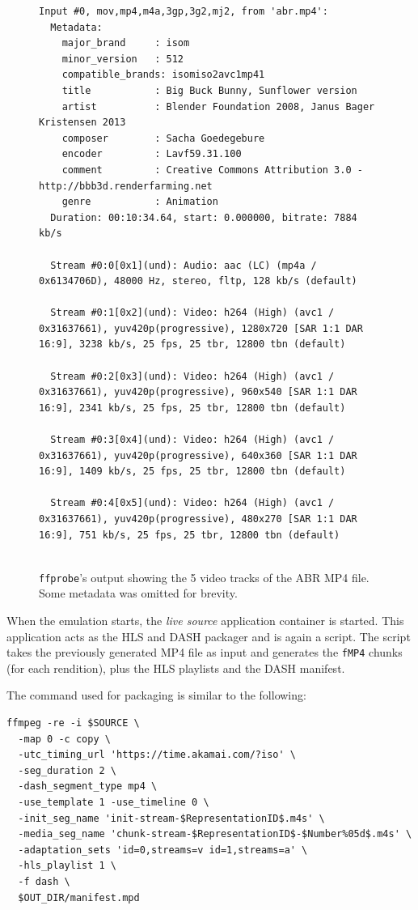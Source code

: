 \begin{figure}[h]
    \centering
    \begin{verbatim}
Input #0, mov,mp4,m4a,3gp,3g2,mj2, from 'abr.mp4':
  Metadata:
    major_brand     : isom
    minor_version   : 512
    compatible_brands: isomiso2avc1mp41
    title           : Big Buck Bunny, Sunflower version
    artist          : Blender Foundation 2008, Janus Bager Kristensen 2013
    composer        : Sacha Goedegebure
    encoder         : Lavf59.31.100
    comment         : Creative Commons Attribution 3.0 - http://bbb3d.renderfarming.net
    genre           : Animation
  Duration: 00:10:34.64, start: 0.000000, bitrate: 7884 kb/s
  
  Stream #0:0[0x1](und): Audio: aac (LC) (mp4a / 0x6134706D), 48000 Hz, stereo, fltp, 128 kb/s (default)
  
  Stream #0:1[0x2](und): Video: h264 (High) (avc1 / 0x31637661), yuv420p(progressive), 1280x720 [SAR 1:1 DAR 16:9], 3238 kb/s, 25 fps, 25 tbr, 12800 tbn (default)
  
  Stream #0:2[0x3](und): Video: h264 (High) (avc1 / 0x31637661), yuv420p(progressive), 960x540 [SAR 1:1 DAR 16:9], 2341 kb/s, 25 fps, 25 tbr, 12800 tbn (default)
  
  Stream #0:3[0x4](und): Video: h264 (High) (avc1 / 0x31637661), yuv420p(progressive), 640x360 [SAR 1:1 DAR 16:9], 1409 kb/s, 25 fps, 25 tbr, 12800 tbn (default)
  
  Stream #0:4[0x5](und): Video: h264 (High) (avc1 / 0x31637661), yuv420p(progressive), 480x270 [SAR 1:1 DAR 16:9], 751 kb/s, 25 fps, 25 tbr, 12800 tbn (default)
  
    \end{verbatim}
    \caption{\texttt{ffprobe}'s output showing the 5 video tracks of the ABR MP4 file. Some metadata was omitted for brevity.}
    \label{fig:ffprobe_abr}
\end{figure}

When the emulation starts, the \textit{live source} application container is started. This application acts as the HLS and DASH packager and is again a \ffmpeg{} script. The script takes the previously generated MP4 file as input and generates the \texttt{fMP4} chunks (for each rendition), plus the HLS playlists and the DASH manifest.

The \ffmpeg{} command used for packaging is similar to the following:

\begin{verbatim}
ffmpeg -re -i $SOURCE \
  -map 0 -c copy \
  -utc_timing_url 'https://time.akamai.com/?iso' \
  -seg_duration 2 \
  -dash_segment_type mp4 \
  -use_template 1 -use_timeline 0 \
  -init_seg_name 'init-stream-$RepresentationID$.m4s' \
  -media_seg_name 'chunk-stream-$RepresentationID$-$Number%05d$.m4s' \
  -adaptation_sets 'id=0,streams=v id=1,streams=a' \
  -hls_playlist 1 \
  -f dash \
  $OUT_DIR/manifest.mpd
\end{verbatim}

